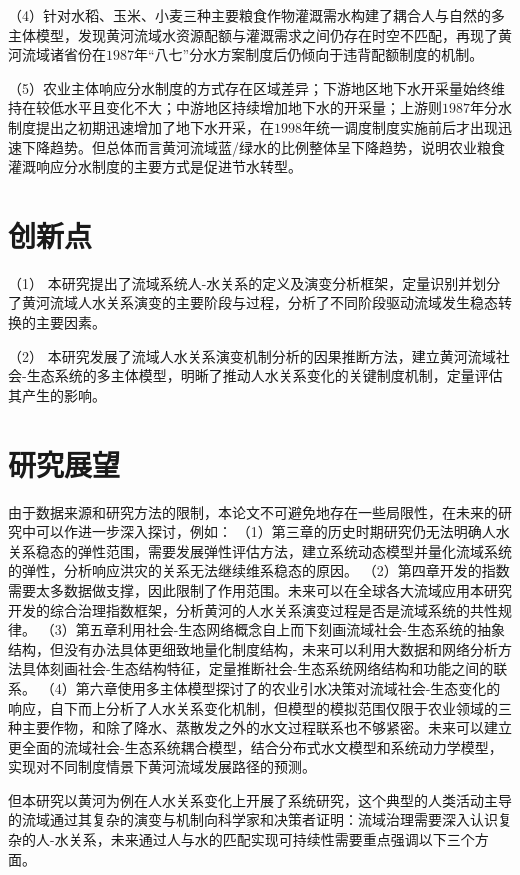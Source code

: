 （4）针对水稻、玉米、小麦三种主要粮食作物灌溉需水构建了耦合人与自然的多主体模型，发现黄河流域水资源配额与灌溉需求之间仍存在时空不匹配，再现了黄河流域诸省份在$1987$年“八七”分水方案制度后仍倾向于违背配额制度的机制。

（5）农业主体响应分水制度的方式存在区域差异；下游地区地下水开采量始终维持在较低水平且变化不大；中游地区持续增加地下水的开采量；上游则$1987$年分水制度提出之初期迅速增加了地下水开采，在$1998$年统一调度制度实施前后才出现迅速下降趋势。但总体而言黄河流域蓝/绿水的比例整体呈下降趋势，说明农业粮食灌溉响应分水制度的主要方式是促进节水转型。

\section{创新点}

（1） 本研究提出了流域系统人-水关系的定义及演变分析框架，定量识别并划分了黄河流域人水关系演变的主要阶段与过程，分析了不同阶段驱动流域发生稳态转换的主要因素。

（2） 本研究发展了流域人水关系演变机制分析的因果推断方法，建立黄河流域社会-生态系统的多主体模型，明晰了推动人水关系变化的关键制度机制，定量评估其产生的影响。

\section{研究展望}

由于数据来源和研究方法的限制，本论文不可避免地存在一些局限性，在未来的研究中可以作进一步深入探讨，例如：
（1）第三章的历史时期研究仍无法明确人水关系稳态的弹性范围，需要发展弹性评估方法，建立系统动态模型并量化流域系统的弹性，分析响应洪灾的关系无法继续维系稳态的原因。
（2）第四章开发的指数需要太多数据做支撑，因此限制了作用范围。未来可以在全球各大流域应用本研究开发的综合治理指数框架，分析黄河的人水关系演变过程是否是流域系统的共性规律。
（3）第五章利用社会-生态网络概念自上而下刻画流域社会-生态系统的抽象结构，但没有办法具体更细致地量化制度结构，未来可以利用大数据和网络分析方法具体刻画社会-生态结构特征，定量推断社会-生态系统网络结构和功能之间的联系。
（4）第六章使用多主体模型探讨了的农业引水决策对流域社会-生态变化的响应，自下而上分析了人水关系变化机制，但模型的模拟范围仅限于农业领域的三种主要作物，和除了降水、蒸散发之外的水文过程联系也不够紧密。未来可以建立更全面的流域社会-生态系统耦合模型，结合分布式水文模型和系统动力学模型，实现对不同制度情景下黄河流域发展路径的预测。

但本研究以黄河为例在人水关系变化上开展了系统研究，这个典型的人类活动主导的流域通过其复杂的演变与机制向科学家和决策者证明：流域治理需要深入认识复杂的人-水关系，未来通过人与水的匹配实现可持续性需要重点强调以下三个方面。

